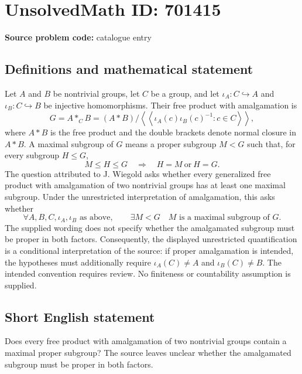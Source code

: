\documentclass[11pt]{article}
\begin{document}
\section*{UnsolvedMath ID: 701415}
\textbf{Source problem code:} catalogue entry
\subsection{Definitions and mathematical statement}
Let \(A\) and \(B\) be nontrivial groups, let \(C\) be a group, and let \(\iota_A:C\hookrightarrow A\) and \(\iota_B:C\hookrightarrow B\) be injective homomorphisms. Their free product with amalgamation is
\[
G=A\mathbin{*_{C}}B
=(A*B)\big/\left\langle\!\left\langle
\iota_A(c)\iota_B(c)^{-1}:c\in C
\right\rangle\!\right\rangle,
\]
where \(A*B\) is the free product and the double brackets denote normal closure in \(A*B\). A maximal subgroup of \(G\) means a proper subgroup \(M<G\) such that, for every subgroup \(H\leq G\),
\[
M\leq H\leq G\quad\Longrightarrow\quad H=M\ \text{or}\ H=G.
\]
The question attributed to J. Wiegold asks whether every generalized free product with amalgamation of two nontrivial groups has at least one maximal subgroup. Under the unrestricted interpretation of amalgamation, this asks whether
\[
\forall A,B,C,\iota_A,\iota_B\text{ as above},\qquad
\exists M<G\quad M\text{ is a maximal subgroup of }G.
\]
The supplied wording does not specify whether the amalgamated subgroup must be proper in both factors. Consequently, the displayed unrestricted quantification is a conditional interpretation of the source: if proper amalgamation is intended, the hypotheses must additionally require \(\iota_A(C)\neq A\) and \(\iota_B(C)\neq B\). The intended convention requires review. No finiteness or countability assumption is supplied.
\subsection{Short English statement}
Does every free product with amalgamation of two nontrivial groups contain a maximal proper subgroup? The source leaves unclear whether the amalgamated subgroup must be proper in both factors.
\end{document}
